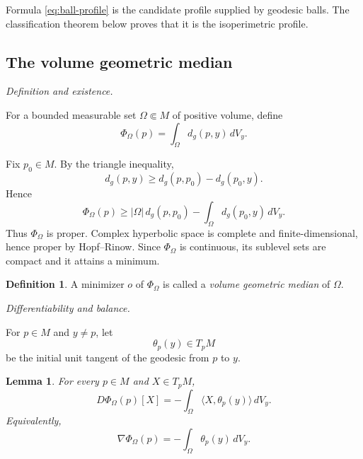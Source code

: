 \documentclass[11pt,reqno]{amsart}
\numberwithin{equation}{section}
\newtheorem{lemma}[theorem]{Lemma}
\theoremstyle{definition}
\newtheorem{definition}[theorem]{Definition}
\theoremstyle{remark}
\newcommand{\distg}{d_g}
\newcommand{\ithead}[1]{%
  \par\medskip\noindent\textit{#1}\enspace
}
\begin{document}
Formula \eqref{eq:ball-profile} is the candidate profile supplied by
geodesic balls. The classification theorem below proves that it is the
isoperimetric profile.

\subsection{The volume geometric median}

\ithead{Definition and existence.}

For a bounded measurable set \(\Omega\Subset M\) of positive volume,
define
\[
\Phi_\Omega(p)
=
\int_\Omega \distg(p,y)\,dV_y.
\]

Fix \(p_0\in M\). By the triangle inequality,
\[
\distg(p,y)
\ge
\distg(p,p_0)-\distg(p_0,y).
\]
Hence
\[
\Phi_\Omega(p)
\ge
|\Omega|\,\distg(p,p_0)
-
\int_\Omega \distg(p_0,y)\,dV_y.
\]
Thus \(\Phi_\Omega\) is proper. Complex hyperbolic space is complete and
finite-dimensional, hence proper by Hopf--Rinow. Since \(\Phi_\Omega\) is
continuous, its sublevel sets are compact and it attains a minimum.

\begin{definition}
A minimizer \(o\) of \(\Phi_\Omega\) is called a
\emph{volume geometric median} of \(\Omega\).
\end{definition}

\ithead{Differentiability and balance.}

For \(p\in M\) and \(y\ne p\), let
\[
\theta_p(y)\in T_pM
\]
be the initial unit tangent of the geodesic from \(p\) to \(y\).

\begin{lemma}
\label{lem:median-differentiability}
For every \(p\in M\) and \(X\in T_pM\),
\begin{equation}
D\Phi_\Omega(p)[X]
=
-
\int_\Omega
\langle X,\theta_p(y)\rangle\,dV_y.
\label{eq:median-first-variation}
\end{equation}
Equivalently,
\begin{equation}
\nabla\Phi_\Omega(p)
=
-
\int_\Omega\theta_p(y)\,dV_y.
\label{eq:median-gradient}
\end{equation}
\end{lemma}
\end{document}

